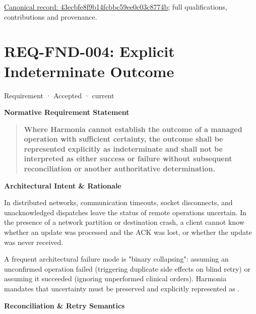 {\footnotesize \href{../../../../continuum/motivation/requirement/43ecbfe8f9b14fcbbc59ee0c03c8774b.md}{Canonical record: 43ecbfe8f9b14fcbbc59ee0c03c8774b}; full qualifications, contributions and provenance.}\par
\section{REQ-FND-004: Explicit Indeterminate Outcome}

\label{element:fc732b64fc564127b73174e28d9ccce8}
{\small Requirement · Accepted · current}\par

\par\medskip\textbf{Normative Requirement Statement}\par


\begin{quote}


\textbf{Where Harmonia cannot establish the outcome of a managed operation with sufficient certainty, the outcome shall be represented explicitly as indeterminate and shall not be interpreted as either success or failure without subsequent reconciliation or another authoritative determination.}



\end{quote}


\par\medskip\textbf{Architectural Intent \& Rationale}\par


In distributed networks, communication timeouts, socket disconnects, and unacknowledged dispatches leave the status of remote operations uncertain. In the presence of a network partition or destination crash, a client cannot know whether an update was processed and the ACK was lost, or whether the update was never received.



A frequent architectural failure mode is "binary collapsing": assuming an unconfirmed operation failed (triggering duplicate side effects on blind retry) or assuming it succeeded (ignoring unperformed clinical orders). Harmonia mandates that uncertainty must be preserved and explicitly represented as \texttt{}.



\par\medskip\textbf{Reconciliation \& Retry Semantics}\par


